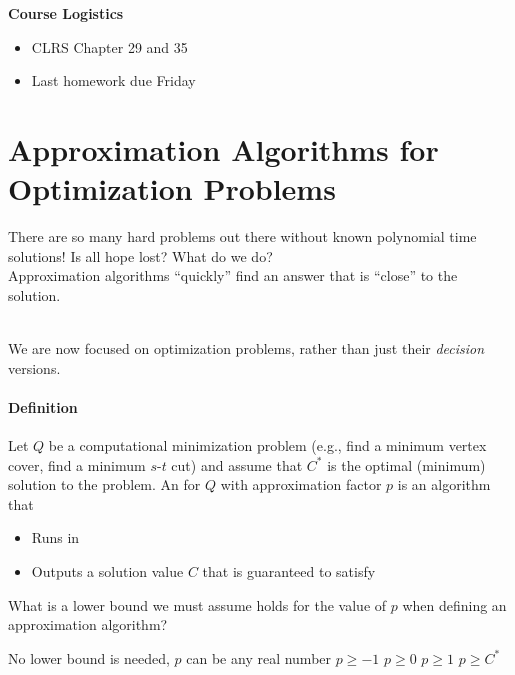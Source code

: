 \documentclass[11  pt]{article}
\begin{document}
	
	\textbf{Course Logistics}
	\begin{itemize}
		\item CLRS Chapter 29 and 35
		\item Last homework due Friday
	\end{itemize}


	
	\section{Approximation Algorithms for Optimization Problems}
	There are so many hard problems out there without known polynomial time solutions! Is all hope lost? What do we do?\\
	
	Approximation algorithms ``quickly'' find an answer that is ``close'' to the solution. \\ \\
	
	\vs{3cm} 
	
	We are now focused on optimization problems, rather than just their \emph{decision} versions.
	\paragraph{Definition}
	Let $Q$ be a computational minimization problem (e.g., find a minimum vertex cover, find a minimum $s$-$t$ cut) and assume that $C^*$ is the optimal (minimum) solution to the problem. An  for $Q$ with approximation factor $p$ is an algorithm that 
	\begin{itemize}
		\item Runs in %
		\item Outputs a solution value $C$ that is guaranteed to satisfy %
	\end{itemize}
	
	\newpage
	
	\begin{Qu}
		What is a lower bound we must assume holds for the value of $p$ when defining an approximation algorithm?
		\begin{itemize}
			\aitem No lower bound is needed, $p$ can be any real number
			\bitem $p \geq -1$
			\citem $p \geq 0$
			\ditem $p \geq 1$
			\eitem $p \geq C^*$
		\end{itemize}
	\end{Qu}
	\vs{1cm}
	
\end{document}
